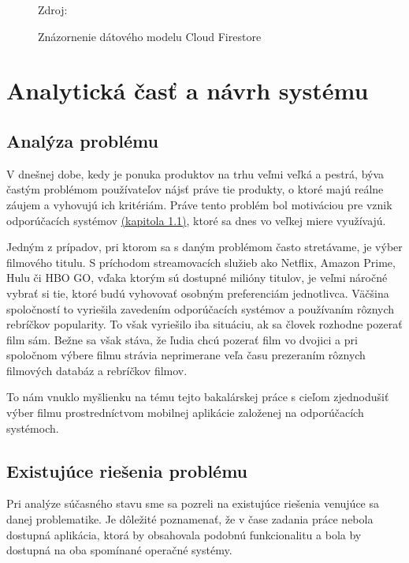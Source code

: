 \begin{figure}[!htbp]
  \centering  
  \def\stackalignment{c}
           {\scriptsize%
            Zdroj: \cite{firestoreimg}}
	\caption{Znázornenie dátového modelu Cloud Firestore} 
  \label{firestore}
\end{figure}


\section{Analytická časť a návrh systému}
\subsection{Analýza problému}
V dnešnej dobe, kedy je ponuka produktov na trhu veľmi veľká a pestrá, býva častým problémom používateľov nájsť práve tie produkty, o ktoré majú reálne záujem a vyhovujú ich kritériám. Práve tento problém bol motiváciou pre vznik odporúčacích systémov \hyperref[sec:odporucacie systemy]{(kapitola 1.1)}, ktoré sa dnes vo veľkej miere využívajú. 

Jedným z prípadov, pri ktorom sa s daným problémom často stretávame, je výber filmového titulu. S príchodom streamovacích služieb ako Netflix, Amazon Prime, Hulu či HBO GO, vďaka ktorým sú dostupné milióny titulov, je veľmi náročné vybrať si tie, ktoré budú vyhovovať osobným preferenciám jednotlivca. Väčšina spoločností to vyriešila zavedením odporúčacích systémov a používaním rôznych rebríčkov popularity. To však vyriešilo iba situáciu, ak sa človek rozhodne pozerať film sám. Bežne sa však stáva, že ľudia chcú pozerať film vo dvojici a pri spoločnom výbere filmu strávia neprimerane veľa času prezeraním rôznych filmových databáz a rebríčkov filmov. 

To nám vnuklo myšlienku na tému tejto bakalárskej práce s cieľom zjednodušiť výber filmu  prostredníctvom mobilnej aplikácie založenej na odporúčacích systémoch.

\subsection{Existujúce riešenia problému}
Pri analýze súčasného stavu sme sa pozreli na existujúce riešenia venujúce sa danej problematike. Je dôležité poznamenať, že v čase zadania práce nebola dostupná aplikácia, ktorá by obsahovala podobnú funkcionalitu a bola by dostupná na oba spomínané operačné systémy. 
